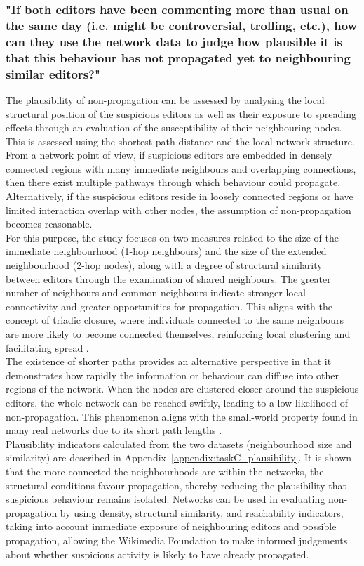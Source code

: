 \documentclass[acmsmall,nonacm,natbib=false]{acmart}
\begin{document}
\subsubsection{\large\textbf{{"If both editors have been commenting more than usual on the same day (i.e. might be controversial, trolling, etc.), how can they use the network data to judge how plausible it is that this behaviour has not propagated yet to neighbouring similar editors?"}}}
\leavevmode \par \noindent
The plausibility of non-propagation can be assessed by analysing the local structural position of the suspicious editors as well as their exposure to spreading effects through an evaluation of the susceptibility of their neighbouring nodes. This is assessed using the shortest-path distance and the local network structure. From a network point of view,  if suspicious editors are embedded in densely connected regions with many immediate neighbours and overlapping connections, then there exist multiple pathways through which behaviour could propagate. Alternatively, if the suspicious editors reside in loosely connected regions or have limited interaction overlap with other nodes, the assumption of non-propagation becomes reasonable.\\
For this purpose, the study focuses on two measures related to the size of the immediate neighbourhood (1-hop neighbours) and the size of the extended neighbourhood (2-hop nodes), along with a degree of structural similarity between editors through the examination of shared neighbours. The greater number of neighbours and common neighbours indicate stronger local connectivity and greater opportunities for propagation. This aligns with the concept of triadic closure, where individuals connected to the same neighbours are more likely to become connected themselves, reinforcing local clustering and facilitating spread \cite{easley2010networks}.\\
The existence of shorter paths provides an alternative perspective in that it demonstrates how rapidly the information or behaviour can diffuse into other regions of the network. When the nodes are clustered closer around the suspicious editors, the whole network can be reached swiftly, leading to a low likelihood of non-propagation. This phenomenon aligns with the small-world property found in many real networks due to its short path lengths \cite{watts1998collective,milgram1967smallworld}.\\
Plausibility indicators calculated from the two datasets (neighbourhood size and similarity) are described in Appendix~\ref{appendix:taskC_plausibility}. It is shown that the more connected the neighbourhoods are within the networks, the structural conditions favour propagation, thereby reducing the plausibility that suspicious behaviour remains isolated. Networks can be used in evaluating non-propagation by using density, structural similarity, and reachability indicators, taking into account immediate exposure of neighbouring editors and possible propagation, allowing the Wikimedia Foundation to make informed judgements about whether suspicious activity is likely to have already propagated.
\end{document}
